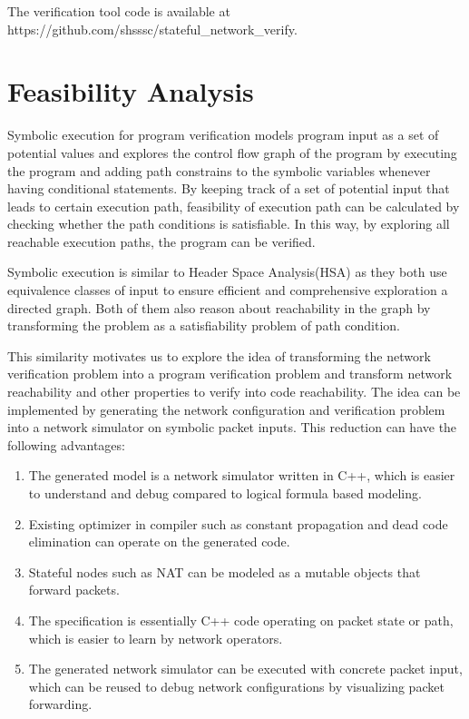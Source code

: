 \documentclass[letterpaper, 10 pt, conference]{ieeeconf}  %
\begin{document}
The verification tool code is available at https://github.com/shsssc/stateful\_network\_verify.

\section{Feasibility Analysis}\label{sec:feasibility}

Symbolic execution for program verification models program input as a set of potential values and explores the control flow graph of the program by executing the program and adding path constrains to the symbolic variables whenever having conditional statements. By keeping track of a set of potential input that leads to certain execution path, feasibility of  execution path can be calculated by checking whether the path conditions is satisfiable. In this way, by exploring all reachable execution paths, the program can be verified.

Symbolic execution is similar to Header Space Analysis(HSA) as they both use equivalence classes of input to ensure efficient and comprehensive exploration a directed graph. Both of them also reason about reachability in the graph by transforming the problem as a satisfiability problem of path condition.

This similarity motivates us to explore the idea of transforming the network verification problem into a program verification problem and transform network reachability and other properties to verify into code reachability. 
The idea can be implemented by generating the network configuration and verification problem into a network simulator on symbolic packet inputs. This reduction can have the following advantages:

\begin{enumerate}
  \item The generated model is a network simulator written in C++, which is easier to understand and debug compared to logical formula based modeling.
  \item Existing optimizer in compiler such as constant propagation and dead code elimination can operate on the generated code.
  \item Stateful nodes such as NAT can be modeled as a mutable objects that forward packets.
  \item The specification is essentially C++ code operating on packet state or path, which is easier to learn by network operators.
  \item The generated network simulator can be executed with concrete packet input, which can be reused to debug network configurations by visualizing packet forwarding.
\end{enumerate}
\end{document}
